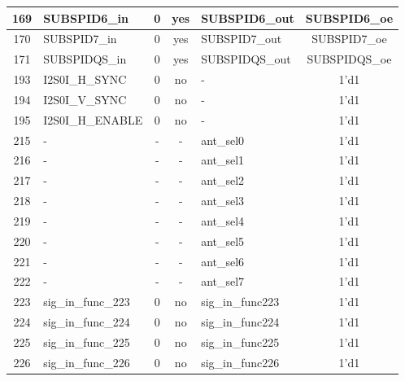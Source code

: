 \begin{longtable}[c]{|c|l|c|c|l|c|}
169  &             SUBSPID6\_in  &  0  &  yes  &           SUBSPID6\_out  &       SUBSPID6\_oe  \\\hline
170  &             SUBSPID7\_in  &  0  &  yes  &           SUBSPID7\_out  &       SUBSPID7\_oe  \\\hline
171  &            SUBSPIDQS\_in  &  0  &  yes  &          SUBSPIDQS\_out  &      SUBSPIDQS\_oe  \\\hline
193  &           I2S0I\_H\_SYNC  &  0  &   no  &                       -  &               1'd1  \\\hline
194  &           I2S0I\_V\_SYNC  &  0  &   no  &                       -  &               1'd1  \\\hline
195  &         I2S0I\_H\_ENABLE  &  0  &   no  &                       -  &               1'd1  \\\hline
215  &                        -  &  -  &    -  &               ant\_sel0  &               1'd1  \\\hline
216  &                        -  &  -  &    -  &               ant\_sel1  &               1'd1  \\\hline
217  &                        -  &  -  &    -  &               ant\_sel2  &               1'd1  \\\hline
218  &                        -  &  -  &    -  &               ant\_sel3  &               1'd1  \\\hline
219  &                        -  &  -  &    -  &               ant\_sel4  &               1'd1  \\\hline
220  &                        -  &  -  &    -  &               ant\_sel5  &               1'd1  \\\hline
221  &                        -  &  -  &    -  &               ant\_sel6  &               1'd1  \\\hline
222  &                        -  &  -  &    -  &               ant\_sel7  &               1'd1  \\\hline
223  &       sig\_in\_func\_223  &  0  &   no  &        sig\_in\_func223  &               1'd1  \\\hline
224  &       sig\_in\_func\_224  &  0  &   no  &        sig\_in\_func224  &               1'd1  \\\hline
225  &       sig\_in\_func\_225  &  0  &   no  &        sig\_in\_func225  &               1'd1  \\\hline
226  &       sig\_in\_func\_226  &  0  &   no  &        sig\_in\_func226  &               1'd1  \\\hline

\end{longtable}
